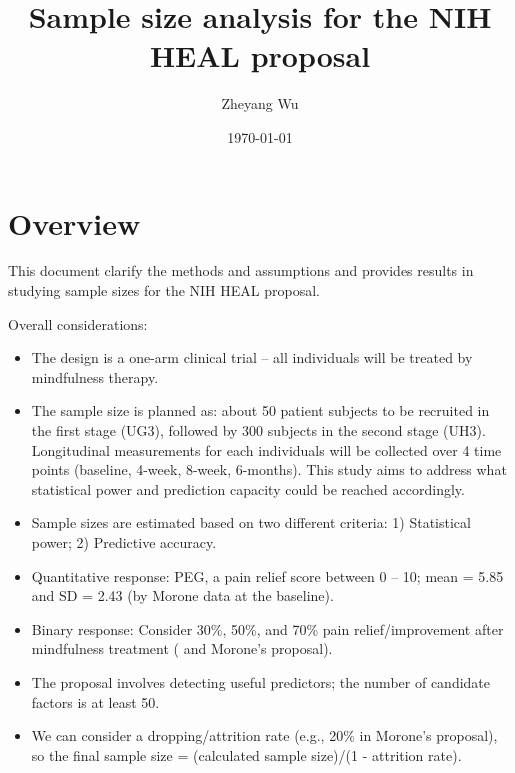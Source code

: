 \documentclass[12pt]{article}
\title{Sample size analysis for the NIH HEAL proposal}
\author{Zheyang Wu}
\date{ \today }
\begin{document}
\maketitle 



\tableofcontents

\section{Overview}
This document clarify the methods and assumptions and provides results in studying sample sizes for the NIH HEAL proposal. 

Overall considerations:
\begin{itemize}
\item The design is a one-arm clinical trial -- all individuals will be treated by mindfulness therapy. 

\item The sample size is planned as: about 50 patient subjects to be recruited in the first stage (UG3), followed by 300 subjects in the second stage (UH3). Longitudinal measurements for each individuals will be collected over 4 time points (baseline, 4-week, 8-week, 6-months). This study aims to address what statistical power and prediction capacity could be reached accordingly. 

\item Sample sizes are estimated based on two different criteria: 
1) Statistical power; 
2) Predictive accuracy. 

\item Quantitative response: PEG, a pain relief score between 0 -- 10; mean = 5.85 and SD = 2.43 (by Morone data at the baseline). %

\item Binary response: Consider 30\%, 50\%, and 70\% pain relief/improvement after mindfulness treatment (\citep{morone2016mind} and Morone's proposal). %

\item The proposal involves detecting useful predictors; the number of candidate factors is at least 50. %


\item We can consider a dropping/attrition rate (e.g.,  20\% in Morone's proposal), so the final sample size = (calculated sample size)/(1 - attrition rate). 
\end{itemize}
\end{document}
